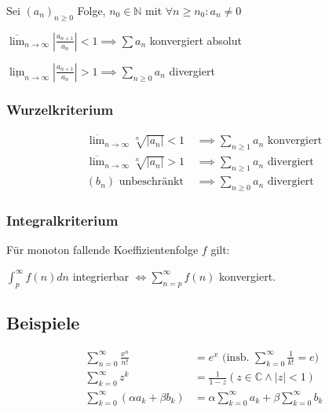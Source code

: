 Sei $(a_n)_{n\geq 0}$ Folge, $n_0 \in \mathbb{N}$ mit $\forall n \geq n_0 : a_n \neq 0$

$\overline\lim_{n \to \infty} |\frac{a_{n+1}}{a_n}| < 1 \implies \sum a_n$ konvergiert absolut

$\underline\lim_{n \to \infty} |\frac{a_{n+1}}{a_n}| > 1 \implies \sum_{n\geq 0} a_n$ divergiert

\subsubsection*{Wurzelkriterium}

\vspace*{-4mm}
\begin{align*}
	\overline\lim_{n \to \infty} \sqrt[n]{|a_n|} < 1 &\implies \textstyle\sum_{n\geq 1} a_n \text{ konvergiert} \\
	\overline\lim_{n \to \infty} \sqrt[n]{|a_n|} > 1 &\implies \textstyle\sum_{n\geq 1} a_n \text{ divergiert} \\
	(b_n) \text{ unbeschränkt } &\implies \textstyle\sum_{n\geq 0} a_n \text{ divergiert}
\end{align*}

\subsubsection*{Integralkriterium}

Für monoton fallende Koeffizientenfolge $f$ gilt:

$\int_p^\infty f(n) dn$ integrierbar $\Leftrightarrow \sum_{n=p}^\infty f(n)$ konvergiert.

\subsection*{Beispiele}

\vspace*{-8mm}
\begin{align*}
	\textstyle\sum_{n=0}^\infty \frac{x^n}{n!} &= e^x \text{ (insb. } \textstyle\sum_{k=0}^{\infty} \frac{1}{k!} = e) \\
	\textstyle\sum_{k=0}^{\infty} z^k &= \frac{1}{1-z} (z \in \mathbb{C} \land |z|<1) \\
	\textstyle\sum_{k=0}^{\infty} (\alpha a_k + \beta b_k) &= \alpha \textstyle\sum_{k=0}^{\infty} a_k + \beta \textstyle\sum_{k=0}^{\infty} b_k
\end{align*}
\vspace*{-4mm}


